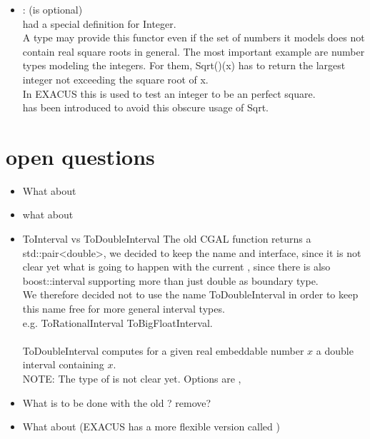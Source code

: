 \begin{itemize}
\item {}: (is optional)\\
       had a special definition for Integer. \\
        A type may provide this functor even if the set of 
        numbers it models does not contain real square roots in general. 
        The most important example are number types modeling the integers. 
        For them, Sqrt()(x) has to return the largest integer not exceeding 
        the square root of x.\\
        In EXACUS this is used to test an integer to be an perfect square. \\
         has been introduced to avoid this obscure 
        usage of Sqrt.  
\end{itemize}


\section{open questions}
\begin{itemize} 
\item What about 
\item what about 

\item ToInterval vs ToDoubleInterval The old CGAL function 
       returns a
      std::pair<double>, we decided to keep the name and interface, since it is not 
      clear yet what is going to happen with the current , 
      since there is also boost::interval supporting more than just double as 
      boundary type.\\
      We therefore decided not to use the name ToDoubleInterval in order to keep 
      this name free for more general interval types. \\
      e.g. ToRationalInterval ToBigFloatInterval. \\
      \\ 
      ToDoubleInterval computes for a given real embeddable number $x$ a double interval containing $x$. \\
      NOTE: The type of  is not clear yet. 
      Options are , 
\item What is to be done with the old  ? remove? 
\item What about  (EXACUS has a more flexible version called )

\end{itemize}

